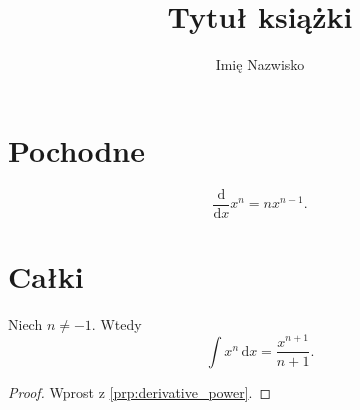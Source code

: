 \documentclass{createspace}
\author{Imię Nazwisko}
\title{Tytuł książki}
\begin{document}





\tableofcontents

\chapter{Pochodne}

\begin{proposition}
    \label{prp:derivative_power}%
    \begin{equation}
        \frac{\mathrm{d}}{\mathrm{d}x} x^n = nx^{n-1}.
    \end{equation}
\end{proposition}

\chapter{Całki}

\begin{integral}
    Niech $n \neq -1$.
    Wtedy
\begin{equation}
    \int x^n \,\mathrm{d}x = \frac{x^{n+1}}{n+1}.
\end{equation}
\end{integral}

\begin{proof}
    Wprost z \ref{prp:derivative_power}.
\end{proof}
\end{document}
